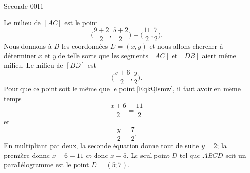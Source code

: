 
\begin{corrige}{Seconde-0011}

    Le milieu de \( [AC]\) est le point
    \begin{equation}        \label{EqkQlsmw}
        \big( \frac{ 9+2 }{2},\frac{ 5+2 }{2} \big)=\big( \frac{ 11 }{2},\frac{ 7 }{2} \big).
    \end{equation}
    Nous donnons à \( D\) les coordonnées \( D=(x,y)\) et nous allons chercher à déterminer \( x\) et \( y\) de telle sorte que les segments \( [AC]\) et \( [DB]\) aient même milieu. Le milieu de \( [BD]\) est
    \begin{equation}
        \big( \frac{ x+6 }{2},\frac{ y }{2} \big).
    \end{equation}
    Pour que ce point soit le même que le point \eqref{EqkQlsmw}, il faut avoir en même temps
    \begin{equation}
        \frac{ x+6 }{ 2 }=\frac{ 11 }{2}
    \end{equation}
    et
    \begin{equation}
        \frac{ y }{ 2 }=\frac{ 7 }{2}.
    \end{equation}
    En multipliant par deux, la seconde équation donne tout de suite \( y=2\); la première donne \( x+6=11\) et donc \( x=5\). Le seul point \( D\) tel que \( ABCD\) soit un parallélogramme est le point \( D=(5;7)\).

\end{corrige}
